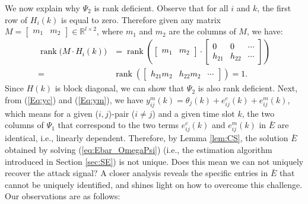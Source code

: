 We now explain why $\Psi_2$ is rank deficient.
Observe that for all $i$ and $k$, the first row of $H_i(k)$ is equal to zero. Therefore given any matrix $M = \begin{bmatrix} m_1 & m_2 \end{bmatrix} \in \mathbb{R}^{l \times 2}$, where $m_1$ and $m_2$ are the columns of $M$, we have:
\textcolor{black}{\begin{align}
\operatorname{rank} \big( M \cdot H_i(k) \big) &=  \operatorname{rank} \left( \begin{bmatrix} m_1 & m_2  \end{bmatrix} \cdot \begin{bmatrix} 0 & 0 & \cdots \\ h_{21} & h_{22} & \cdots \end{bmatrix} \right)\nonumber\\
	= &\operatorname{rank} \left( \begin{bmatrix} h_{21} m_2 & h_{22} m_2 & \cdots \end{bmatrix} \right)=1.
\end{align}}
Since $H(k)$ is block diagonal, we can show that $\Psi_2$ is also rank deficient.
Next, from (\ref{Eq:yc}) and (\ref{Eq:ym}), we have $y^m_{ij}(k) = \theta_j(k) + e^c_{ij}(k) + e^m_{ij}(k)$, which means for a given ($i,j$)-pair ($i \neq j$) and a given time slot $k$, the two columns of $\Psi_1$ that correspond to the two terms $e^c_{ij}(k)$ and $e^m_{ij}(k)$ in $\bar E$ are identical, i.e., linearly dependent. Therefore, by Lemma \ref{lem:CS}, the solution $\bar E$ obtained by solving (\ref{eq:Ebar_OmegaPsi}) (i.e., the estimation algorithm introduced in Section \ref{sec:SE}) is not unique.
Does this mean we can not uniquely recover the attack signal?
A closer analysis reveals the specific entries in $\bar E$ that cannot be uniquely identified, and shines light on how to overcome this challenge. Our observations are as follows:
